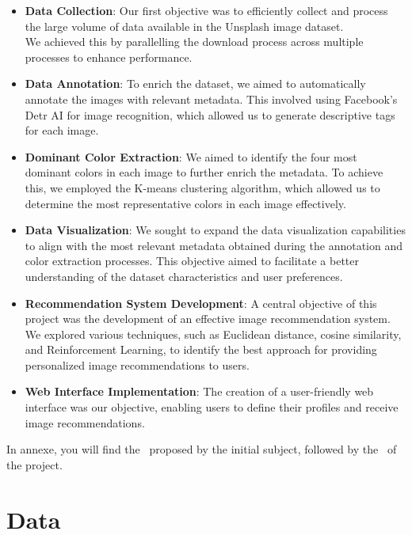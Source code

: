 \documentclass{article}
\begin{document}
    \begin{itemize}
        \item \textbf{Data Collection}: Our first objective was to efficiently collect and process the large volume of data available in the Unsplash image dataset.\\We achieved this by parallelling the download process across multiple processes to enhance performance.
        \item \textbf{Data Annotation}: To enrich the dataset, we aimed to automatically annotate the images with relevant metadata. This involved using Facebook's Detr AI for image recognition, which allowed us to generate descriptive tags for each image.
        \item \textbf{Dominant Color Extraction}: We aimed to identify the four most dominant colors in each image to further enrich the metadata. To achieve this, we employed the K-means clustering algorithm, which allowed us to determine the most representative colors in each image effectively.
        \item \textbf{Data Visualization}:  We sought to expand the data visualization capabilities to align with the most relevant metadata obtained during the annotation and color extraction processes. This objective aimed to facilitate a better understanding of the dataset characteristics and user preferences.
        \item \textbf{Recommendation System Development}: A central objective of this project was the development of an effective image recommendation system. We explored various techniques, such as Euclidean distance, cosine similarity, and Reinforcement Learning, to identify the best approach for providing personalized image recommendations to users.
        \item \textbf{Web Interface Implementation}: The creation of a user-friendly web interface was our objective, enabling users to define their profiles and receive image recommendations.
    \end{itemize}

    In annexe, you will find the~\hyperref[subsec:target_architecture]{} proposed by the initial subject, followed by the~\hyperref[subsec:actual_architecture]{} of the project.

    \section{Data}\label{sec:data}
\end{document}

